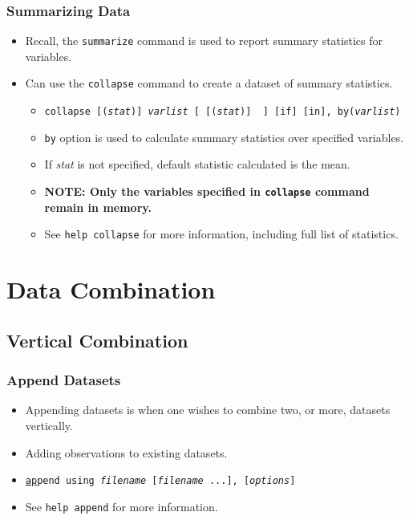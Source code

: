 \documentclass{beamer}
\begin{document}
\begin{frame}
	\frametitle{Summarizing Data}
		\begin{itemize}
			\item Recall, the \texttt{summarize} command is used to report summary statistics for variables.
			\item Can use the \texttt{collapse} command to create a dataset of summary statistics.
				\begin{itemize}
					\item \texttt{collapse [(\textit{stat})] \textit{varlist} [ [(\textit{stat})] \textellipsis~] [if] [in], by(\textit{varlist})}
					\item \texttt{by} option is used to calculate summary statistics over specified variables.
					\item If \textit{stat} is not specified, default statistic calculated is the mean.
					\item \textbf{NOTE: Only the variables specified in \texttt{collapse} command remain in memory.}
					\item See \texttt{help collapse} for more information, including full list of statistics.
				\end{itemize}
		\end{itemize}
\end{frame}

\section{Data Combination}

\subsection{Vertical Combination}

\begin{frame}
	\frametitle{Append Datasets}
		\begin{itemize}
			\item Appending datasets is when one wishes to combine two, or more, datasets vertically.
			\item Adding observations to existing datasets.
			\item \texttt{\underline{ap}pend using \textit{filename} [\textit{filename} ...], [\textit{options}]}
			\item See \texttt{help append} for more information.
		\end{itemize}
\end{frame}
\end{document}

